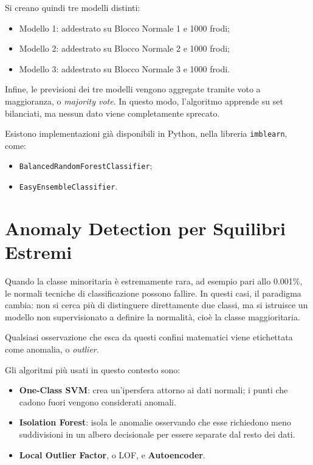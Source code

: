 \documentclass[11pt, a4paper]{article}
\begin{document}
Si creano quindi tre modelli distinti:

\begin{itemize}
    \item Modello 1: addestrato su Blocco Normale 1 e 1000 frodi;
    \item Modello 2: addestrato su Blocco Normale 2 e 1000 frodi;
    \item Modello 3: addestrato su Blocco Normale 3 e 1000 frodi.
\end{itemize}

Infine, le previsioni dei tre modelli vengono aggregate tramite voto a
maggioranza, o \emph{majority vote}. In questo modo, l'algoritmo apprende su set
bilanciati, ma nessun dato viene completamente sprecato.

Esistono implementazioni già disponibili in Python, nella libreria
\texttt{imblearn}, come:

\begin{itemize}
    \item \texttt{BalancedRandomForestClassifier};
    \item \texttt{EasyEnsembleClassifier}.
\end{itemize}

\section{Anomaly Detection per Squilibri Estremi}

Quando la classe minoritaria è estremamente rara, ad esempio pari allo 0.001\%,
le normali tecniche di classificazione possono fallire. In questi casi, il
paradigma cambia: non si cerca più di distinguere direttamente due classi, ma si
istruisce un modello non supervisionato a definire la normalità, cioè la classe
maggioritaria.

Qualsiasi osservazione che esca da questi confini matematici viene etichettata
come anomalia, o \emph{outlier}.

Gli algoritmi più usati in questo contesto sono:

\begin{itemize}
    \item \textbf{One-Class SVM}: crea un'ipersfera attorno ai dati normali; i
    punti che cadono fuori vengono considerati anomali.

    \item \textbf{Isolation Forest}: isola le anomalie osservando che esse
    richiedono meno suddivisioni in un albero decisionale per essere separate dal
    resto dei dati.

    \item \textbf{Local Outlier Factor}, o LOF, e \textbf{Autoencoder}.
\end{itemize}
\end{document}
